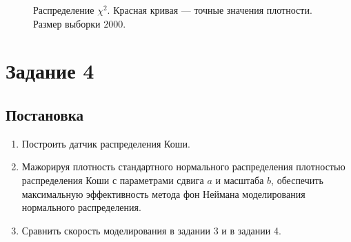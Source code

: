 \documentclass[12pt, a4paper]{article}
\begin{document}
\begin{figure}[H]
\caption{Распределение $\chi^2$. Красная кривая --- точные значения плотности. Размер выборки $2000$.}
\end{figure}

\newpage

\section{Задание 4}
\subsection{Постановка}
\begin{enumerate}
\item Построить датчик распределения Коши.
\item Мажорируя плотность стандартного нормального распределения плотностью распределения Коши с параметрами сдвига $a$ и масштаба $b$, обеспечить максимальную эффективность метода фон Неймана моделирования нормального распределения.
\item Сравнить скорость моделирования в задании 3 и в задании 4.
\end{enumerate}
\end{document}
